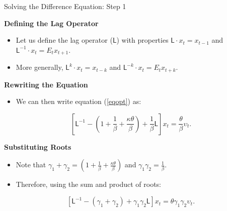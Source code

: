 \documentclass[11pt,aspectratio=169]{beamer}
\begin{document}
\begin{frame}{Solving the Difference Equation: Step 1}
\small

\textbf{Defining the Lag Operator}
\begin{itemize}
    \item Let us define the lag operator ($\mathsf{L}$) with properties $\mathsf{L}\cdot x_{t}=x_{t-1}$ and $\mathsf{L}^{-1}\cdot x_{t}=E_{t}x_{t+1}$.
    \item More generally, $\mathsf{L}^{k}\cdot x_{t}=x_{t-k}$ and $\mathsf{L}^{-k}\cdot x_{t}=E_{t}x_{t+k}$.
\end{itemize}

\textbf{Rewriting the Equation}
\begin{itemize}
    \item We can then write equation (\ref{eqopt}) as:
\end{itemize}
\begin{equation*}
\left[ \mathsf{L}^{-1}-\left( 1+\frac{1}{\beta }+\frac{\kappa \theta }{\beta
}\right) +\frac{1}{\beta }\mathsf{L}\right] x_{t}=\frac{\theta }{\beta }%
\upsilon _{t}.
\end{equation*}

\textbf{Substituting Roots}
\begin{itemize}
\item Note that $\gamma_1+\gamma_2=\left( 1+\frac{1}{\beta }+\frac{\kappa \theta }{\beta
}\right)$ and $\gamma_1\gamma_2=\frac{1}{\beta }.$
    \item Therefore, using the sum and product of roots:
\end{itemize}
\begin{equation*}
\left[ \mathsf{L}^{-1}-\left( \gamma _{1}+\gamma _{2}\right) +\gamma
_{1}\gamma _{2}\mathsf{L}\right] x_{t}=\theta \gamma _{1}\gamma _{2}\upsilon
_{t}.
\end{equation*}

\end{frame}
\end{document}

